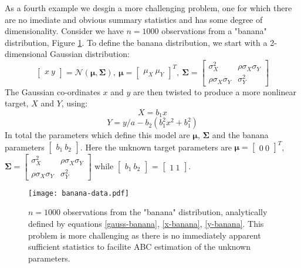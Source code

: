 As a fourth example we desgin a more challenging problem, one for which there are no imediate and obvious summary statistics and has some degree of dimensionality. Consider we have $n = 1000$ observations from a "banana" distribution, Figure \ref{banana-data}. To define the banana distribution, we start with a 2-dimensional Gaussian distribution:
\begin{equation}
\begin{bmatrix}
x\ y
\end{bmatrix}=\mathcal{N}(\bm{\mu},\bm{\Sigma}),\ \bm{\mu} = \begin{bmatrix}
\mu_X\ \mu_Y
\end{bmatrix}^T,\ \bm{\Sigma} = \begin{bmatrix}
\sigma^2_X & \rho\sigma_X\sigma_Y\\
\rho\sigma_X\sigma_Y & \sigma^2_Y
\end{bmatrix} 
\label{gauss-banana}
\end{equation}
The Gaussian co-ordinates $x$ and $y$ are then twisted to produce a more nonlinear target, $X$ and $Y$, using:
\begin{equation}
X = b_1x
\label{x-banana}
\end{equation}
\begin{equation}
Y = y/a-b_2(b_1^2x^2+b_1^2)
\label{y-banana}
\end{equation}
In total the parameters which define this model are $\bm{\mu}$, $\bm{\Sigma}$ and the banana parameters $\begin{bmatrix}
b_1\ b_2
\end{bmatrix}$. Here the unknown target parameters are $\bm{\mu} = \begin{bmatrix}
0\ 0
\end{bmatrix}^T$,
$\bm{\Sigma} = \begin{bmatrix}
\sigma^2_X & \rho\sigma_X\sigma_Y\\
\rho\sigma_X\sigma_Y & \sigma^2_Y
\end{bmatrix}$ while $\begin{bmatrix}
b_1\ b_2
\end{bmatrix}$ = $\begin{bmatrix}
1\ 1
\end{bmatrix}$. 

\begin{figure}[H]
\centering
\texttt{[image: banana-data.pdf]}
\caption{$n = 1000$ observations from the "banana" distribution, analytically defined by equations \ref{gauss-banana}, \ref{x-banana}, \ref{y-banana}. 
This problem is more challenging as there is no immediately apparent sufficient statistics to facilite ABC estimation of the unknown parameters.}
\label{banana-data}
\end{figure}

